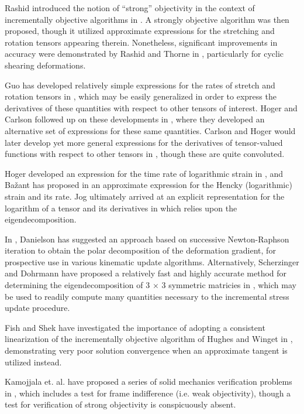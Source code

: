 Rashid introduced the notion of ``strong'' objectivity in the context of incrementally objective algorithms in \cite{rashid1993}. A strongly objective algorithm was then proposed, though it utilized approximate expressions for the stretching and rotation tensors appearing therein. Nonetheless, significant improvements in accuracy were demonstrated by Rashid and Thorne in \cite{rashid1996}, particularly for cyclic shearing deformations.

Guo has developed relatively simple expressions for the rates of stretch and rotation tensors in \cite{guo1984}, which may be easily generalized in order to express the derivatives of these quantities with respect to other tensors of interest. Hoger and Carlson followed up on these developments in \cite{hoger1984}, where they developed an alternative set of expressions for these same quantities. Carlson and Hoger would later develop yet more general expressions for the derivatives of tensor-valued functions with respect to other tensors in \cite{carlson1986}, though these are quite convoluted.

Hoger developed an expression for the time rate of logarithmic strain in \cite{hoger1986}, and Ba\v{z}ant has proposed in \cite{bazant1998} an approximate expression for the Hencky (logarithmic) strain and its rate. Jog ultimately arrived at an explicit representation for the logarithm of a tensor and its derivatives in \cite{jog2008} which relies upon the eigendecomposition.

In \cite{danielson2014}, Danielson has suggested an approach based on successive Newton-Raphson iteration to obtain the polar decomposition of the deformation gradient, for prospective use in various kinematic update algorithms. Alternatively, Scherzinger and Dohrmann have proposed a relatively fast and highly accurate method for determining the eigendecomposition of 3 $\times$ 3 symmetric matricies in \cite{scherzinger2008}, which may be used to readily compute many quantities necessary to the incremental stress update procedure.

Fish and Shek have investigated the importance of adopting a consistent linearization of the incrementally objective algorithm of Hughes and Winget in \cite{fish1999}, demonstrating very poor solution convergence when an approximate tangent is utilized instead.

Kamojjala et. al. have proposed a series of solid mechanics verification problems in \cite{kamojjala2015}, which includes a test for frame indifference (i.e. weak objectivity), though a test for verification of strong objectivity is conspicuously absent.

